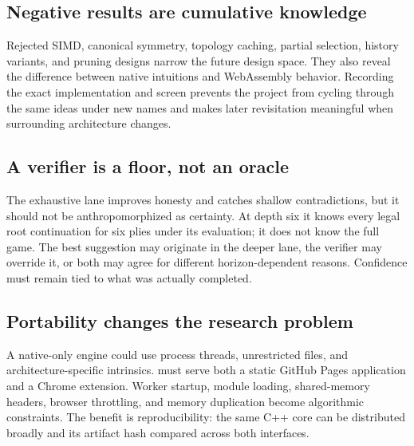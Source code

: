 \subsection{Negative results are cumulative knowledge}
Rejected SIMD, canonical symmetry, topology caching, partial selection, history variants, and pruning designs narrow the future design space. They also reveal the difference between native intuitions and WebAssembly behavior. Recording the exact implementation and screen prevents the project from cycling through the same ideas under new names and makes later revisitation meaningful when surrounding architecture changes.

\subsection{A verifier is a floor, not an oracle}
The exhaustive lane improves honesty and catches shallow contradictions, but it should not be anthropomorphized as certainty. At depth six it knows every legal root continuation for six plies under its evaluation; it does not know the full game. The best suggestion may originate in the deeper lane, the verifier may override it, or both may agree for different horizon-dependent reasons. Confidence must remain tied to what was actually completed.

\subsection{Portability changes the research problem}
A native-only engine could use process threads, unrestricted files, and architecture-specific intrinsics. \walwuk{} must serve both a static GitHub Pages application and a Chrome extension. Worker startup, module loading, shared-memory headers, browser throttling, and memory duplication become algorithmic constraints. The benefit is reproducibility: the same C++ core can be distributed broadly and its artifact hash compared across both interfaces.
